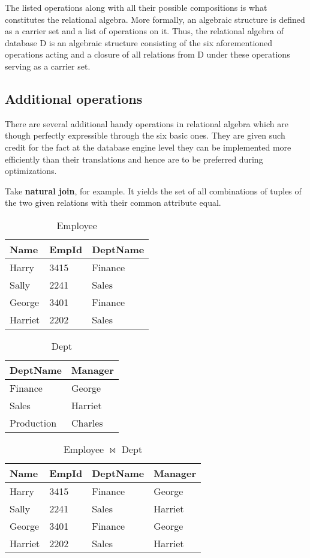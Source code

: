 \documentclass[12pt]{article}
\begin{document}
The listed operations along with all their possible compositions is what constitutes
the relational algebra.
More formally, an algebraic structure is defined as a carrier set and a list of operations on it.
Thus, the relational algebra of database D is an algebraic structure
consisting of the six aforementioned operations acting and
a closure of all relations from D under these operations serving as a carrier set.

\subsection{Additional operations}

There are several additional handy operations in relational algebra which are though perfectly
expressible through the six basic ones. They are given such credit for the fact at the database engine level
they can be implemented more efficiently than their translations and hence are to be preferred during
optimizations.

Take \textbf{natural join}, for example. It yields the set of all combinations of tuples of
the two given relations with their common attribute equal.

\begin{table}[H]
\caption{Employee}
\centering
\begin{tabular}{ l l l }
Name & EmpId & DeptName \\
\hline
Harry & 3415 & Finance \\
Sally & 2241 & Sales \\
George & 3401 & Finance \\
Harriet & 2202 & Sales \\
\end{tabular}
\end{table}

\begin{table}[H]
\caption{Dept}
\centering
\begin{tabular}{ l l }
DeptName & Manager \\
\hline
Finance & George \\
Sales & Harriet \\
Production & Charles \\
\end{tabular}
\end{table}

\begin{table}[H]
\caption{Employee $\bowtie$ Dept}
\centering
\begin{tabular}{ l l l l }
Name & EmpId & DeptName & Manager \\
\hline
Harry & 3415 & Finance & George \\ 
Sally & 2241 & Sales & Harriet \\
George & 3401 & Finance & George \\
Harriet & 2202 & Sales & Harriet \\
\end{tabular}
\end{table}
\end{document}
